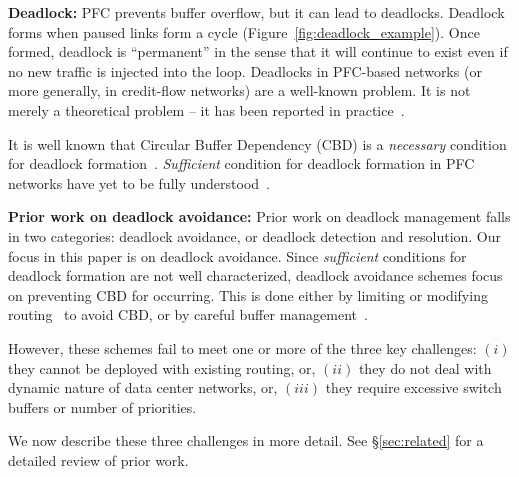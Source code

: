 {\bf Deadlock:} PFC prevents buffer overflow, but it can lead to deadlocks.
Deadlock forms when paused links form a cycle
(Figure~\ref{fig:deadlock_example}). Once formed, deadlock is ``permanent'' in
the sense that it will continue to exist even if no new traffic is injected into
the loop. Deadlocks in PFC-based networks (or more generally, in credit-flow
networks) are a well-known problem. It is not merely a theoretical problem -- it
has been reported in practice~\cite{rdmaatscale}.

It is well known that Circular Buffer Dependency (CBD) is a {\em necessary}
condition for deadlock formation~\cite{tcp-bolt,hu2016deadlocks}. {\em
Sufficient} condition for deadlock formation in PFC networks have yet to be
fully understood~\cite{hu2016deadlocks}. 

{\bf Prior work on deadlock avoidance:} Prior work on deadlock management falls
in two categories: deadlock avoidance, or deadlock detection and resolution. Our
focus in this paper is on deadlock avoidance.  Since {\em sufficient} conditions
for deadlock formation are not well characterized, deadlock avoidance schemes
focus on preventing CBD for occurring. This is done either by limiting or
modifying routing~\cite{tcpbolt} to avoid CBD, or by careful buffer
management~\cite{xxx}. 

However, these schemes fail to meet one or more of the three key challenges:
$(i)$ they cannot be deployed with existing routing, or, $(ii)$ they do not deal
with dynamic nature of data center networks, or, $(iii)$ they require excessive
switch buffers or number of priorities. 

We now describe these three challenges in more detail. See \S\ref{sec:related}
for a detailed review of prior work.

